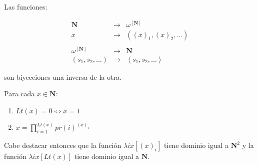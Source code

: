   \begin{lemma}
    \par Las funciones:

    \begin{eqnarray}
    	\nonumber \mathbf{N} &\rightarrow& \omega^{\left[\mathbf{N}\right]} \\
    	\nonumber x &\rightarrow& ((x)_{1}, (x)_{2}, \dotsc) \\
      \nonumber \\
      \nonumber \omega^{\left[\mathbf{N}\right]} &\rightarrow& \mathbf{N} \\
      \nonumber (s_{1}, s_{2}, \dotsc) &\rightarrow& \left\langle s_{1}, s_{2}, \dotsc \right\rangle
  	\end{eqnarray}

    \par son biyecciones una inversa de la otra.
  \end{lemma}

  \begin{lemma}
    \par Para cada $x \in \mathbf{N}$:

    \begin{enumerate}
      \item $Lt(x) = 0 \Leftrightarrow x = 1$
      \item $x = \prod\nolimits_{i=1}^{Lt(x)} pr(i)^{(x)_{i}}$
    \end{enumerate}

    \par Cabe destacar entonces que la función $\lambda ix[(x)_{i}]$ tiene dominio igual a $\mathbf{N}^{2}$ y la
    función $\lambda ix[Lt(x)]$ tiene dominio igual a $\mathbf{N}$.
  \end{lemma}
